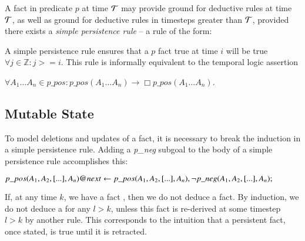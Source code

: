 A fact in predicate $p$ at time $\Tau$ may provide ground for deductive rules
at time $\Tau$, as well as ground for deductive rules in timesteps greater than $\Tau$,
provided there exists a {\em simple persistence rule} -- a rule of the form:



A simple persistence rule ensures that a $p$ fact true at time $i$ will be true
$\forall j \in \mathbb{Z} : j >= i$.  This rule is informally equivalent to the
temporal logic assertion

$\forall A_1 \ldots A_n \in p\_pos : p\_pos(A_1 \ldots A_n) \to \Box p\_pos(A_1
\ldots A_n)$.


\subsection{Mutable State}

To model deletions and updates of a fact, it is necessary to break the induction
in a simple persistence rule.  Adding a {\em p\_neg} subgoal to the body of a
simple persistence rule accomplishes this:

$p\_pos(A_1,A_2,[...],A_n)@next \leftarrow \\
p\_pos(A_1,A_2,[...],A_n), \\
\lnot p\_neg(A_1,A_2,[...],A_n);
$

%
%

If, at any time $k$, we have a fact
, then we do not deduce a
 fact.  By induction, we do not
deduce a  for any $l > k$, unless
this  fact is re-derived at some timestep $l > k$ by another
rule.  This corresponds to the intuition that a persistent fact, once stated,
is true until it is retracted.  

